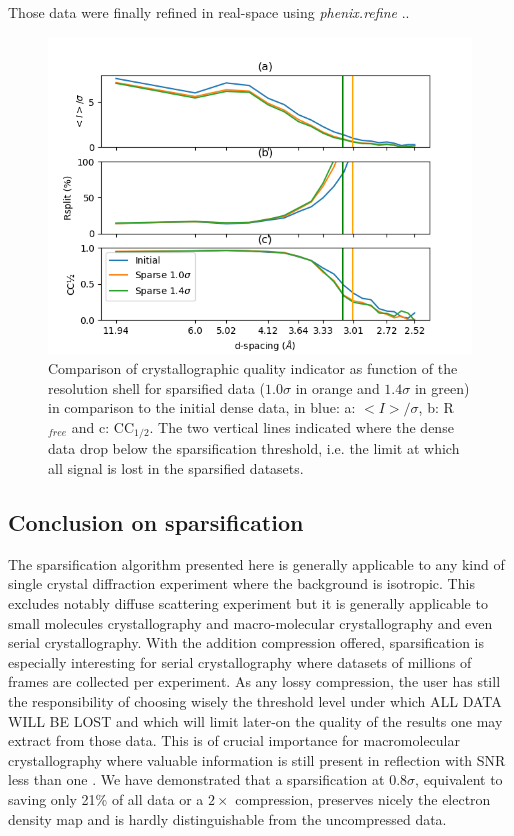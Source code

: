 \documentclass[preprint]{iucr}              %
\begin{document}
Those data were finally refined in real-space using \textit{phenix.refine} ..
\begin{figure}
\label{r-NQO1}
\includegraphics[width=12cm]{NQO1/NQO1}
\caption{Comparison of crystallographic quality indicator as function of the resolution shell for sparsified data ($1.0\sigma$ in orange and $1.4\sigma$ in green) in comparison to the initial dense data, in blue:
a: $<I>/\sigma$, b: R$_{free}$ and c: CC$_{1/2}$.
The two vertical lines indicated where the dense data drop below the sparsification threshold, i.e. the limit at which all signal is lost in the sparsified datasets.  }
\end{figure}


\subsection{Conclusion on sparsification}
The sparsification algorithm presented here is generally applicable to any kind of single crystal diffraction experiment where the background is isotropic. 
This excludes notably diffuse scattering experiment but it is generally applicable to small molecules crystallography and macro-molecular crystallography and even serial crystallography.
With the addition compression offered, sparsification is especially interesting for serial crystallography where datasets of millions of frames are collected per experiment.
As any lossy compression, the user has still the responsibility of choosing wisely the threshold level under which ALL DATA WILL BE LOST and which will limit later-on the quality of the results one may extract from those data. 
This is of crucial importance for macromolecular crystallography where valuable information is still present in reflection with SNR less than one \cite{cc1/2}.
We have demonstrated that a sparsification at $0.8\sigma$, equivalent to saving only 21\% of all data
or a $2\times$ compression, preserves nicely the electron density map and is hardly distinguishable from the uncompressed data.
\end{document}
